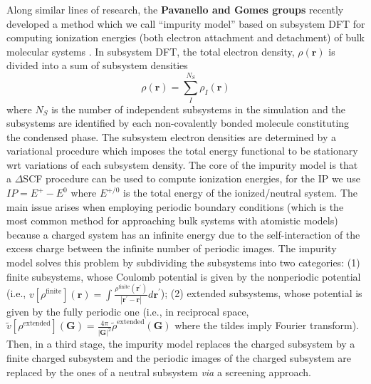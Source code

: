 \documentclass[notitlepage,12pt]{report}
\def\br{{\mathbf{r}}}
\def\bG{{\mathbf{G}}}
\def\brp{{\mathbf{r}^\prime}}
\begin{document}
    Along similar lines of research, the {\bf Pavanello and Gomes groups} recently developed a method which we call ``impurity model'' based on subsystem DFT \supercite{jacob2014subsystem,wesolowski2015frozen,krishtal2015subsystem} for computing ionization energies (both electron attachment and detachment) of bulk molecular systems \supercite{tolle2019charged}. In subsystem DFT,  the total electron density, $\rho(\br)$ is divided into a sum of subsystem densities 
\begin{equation}
    \label{dens}
    \rho(\br) = \sum_I^{N_S}\rho_I(\br)
\end{equation}
    where $N_S$ is the number of independent subsystems in the simulation and the subsystems are identified by each non-covalently bonded molecule constituting the condensed phase. The subsystem electron densities are determined by a variational procedure which imposes the total energy functional to be stationary wrt variations of each subsystem density. The core of the impurity model is that a $\Delta$SCF procedure\supercite{bagus1965self,waskom2017mwaskom} can be used to compute ionization energies, for the IP we use $IP=E^+-E^0$ where $E^{+/0}$ is the total energy of the ionized/neutral system. The main issue arises when employing periodic boundary conditions (which is the most common method for approaching bulk systems with atomistic models) because a charged system has an infinite energy due to the self-interaction of the excess charge between the infinite number of periodic images. The impurity model solves this problem by subdividing the subsystems into two categories: (1) finite subsystems, whose Coulomb potential is given by the nonperiodic potential (i.e., $v[\rho^{\text{finite}}](\br)=\int\frac{\rho^{\text{finite}}(\brp)}{|\brp-\br|}d\brp$); (2) extended subsystems, whose potential is given by the fully periodic one (i.e., in reciprocal space, $\tilde v[\rho^{\text{extended}}](\bG)=\frac{4\pi}{|\bG|^2}\tilde\rho^\text{extended}(\bG)$ where the tildes imply Fourier transform). Then, in a third stage, the impurity model replaces the charged subsystem by a finite charged subsystem and the periodic images of the charged subsystem are replaced by the ones of a neutral subsystem {\it via} a screening approach.
\end{document}
